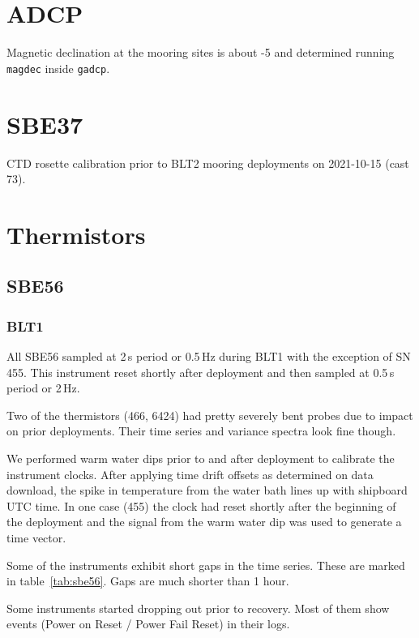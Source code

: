 \documentclass[10pt,letterpaper]{article}
\begin{document}
\section*{ADCP}
\label{sec:adcp}

Magnetic declination at the mooring sites is about -5 and determined running \lstinline{magdec} inside \lstinline{gadcp}.


\section*{SBE37}
\label{sec:sbe37}


CTD rosette calibration prior to BLT2 mooring deployments on 2021-10-15 (cast 73).


\section*{Thermistors}
\label{sec:thermistors}

\subsection*{SBE56}
\label{sec:sbe56}

\subsubsection*{BLT1}
\label{sub:sbe56_blt1}
All SBE56 sampled at 2\,s period or 0.5\,Hz during BLT1 with the exception of SN\,455. This instrument reset shortly after deployment and then sampled at 0.5\,s period or 2\,Hz.

Two of the thermistors (466, 6424) had pretty severely bent probes due to impact on prior deployments. Their time series and variance spectra look fine though.

We performed warm water dips prior to and after deployment to calibrate the instrument clocks. After applying time drift offsets as determined on data download, the spike in temperature from the water bath lines up with shipboard UTC time. In one case (455) the clock had reset shortly after the beginning of the deployment and the signal from the warm water dip was used to generate a time vector.

Some of the instruments exhibit short gaps in the time series. These are marked in table~\ref{tab:sbe56}. Gaps are much shorter than 1 hour.

Some instruments started dropping out prior to recovery. Most of them show events (Power on Reset / Power Fail Reset) in their logs.
\end{document}
